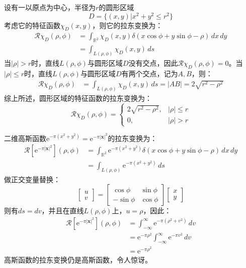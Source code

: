 \begin{example}[圆形特征函数的拉东变换]
    设有一以原点为中心，半径为$r$的圆形区域$$D=\{(x,y)|x^2+y^2\leq r^2\}$$
    考虑它的特征函数$\chi_D(x,y)$，则它的拉东变换为：
    \begin{align*}
        \mathcal{R} \chi_D(\rho,\phi)&=\int_{\mathbb{R}^2}\chi_D(x,y)\delta(x\cos\phi+y\sin\phi-\rho)\,dx\,dy\\
        &=\int_{L(\rho,\phi)}\chi_D(x,y)\,ds
    \end{align*}
    当$|\rho|>r$时，直线$L(\rho,\phi)$与圆形区域$D$没有交点，因此$\mathcal{R} \chi_D(\rho,\phi)=0$。当$|\rho|\leq r$时，直线$L(\rho,\phi)$与圆形区域$D$有两个交点，记为$A,B$，则：
    \begin{align*}
        \mathcal{R} \chi_D(\rho,\phi)&=\int_{L(\rho,\phi)}\chi_D(x,y)\,ds=|AB|=2\sqrt{r^2-\rho^2}
    \end{align*}
    综上所述，圆形区域的特征函数的拉东变换为：
    \[\mathcal{R} \chi_D(\rho,\phi)=\begin{cases}
        2\sqrt{r^2-\rho^2},&|\rho|\leq r\\
        0,&|\rho|>r
    \end{cases}\]
\end{example}
\begin{example}[高斯函数的拉东变换]
    二维高斯函数$\mathrm{e}^{-\pi(x^2+y^2)}=\mathrm{e}^{-\pi|\mathbf{x}|^2}$的拉东变换为：
    \begin{align*}
        \mathcal{R} [\mathrm{e}^{-\pi|\mathbf{x}|^2}](\rho,\phi)&=\int_{\mathbb{R}^2}\mathrm{e}^{-\pi(x^2+y^2)}\delta(x\cos\phi+y\sin\phi-\rho)\,dx\,dy\\
        &=\int_{L(\rho,\phi)}\mathrm{e}^{-\pi(x^2+y^2)}\,ds
    \end{align*}
    做正交变量替换：
    \[\begin{bmatrix}u\\v\end{bmatrix}=\begin{bmatrix}
        \cos\phi & \sin\phi\\
        -\sin\phi & \cos\phi
    \end{bmatrix}\begin{bmatrix}x\\y\end{bmatrix}\]
    则有$ds=dv$，并且在直线$L(\rho,\phi)$上，$u=\rho$，因此：
    \begin{align*}
        \mathcal{R} [\mathrm{e}^{-\pi|\mathbf{x}|^2}](\rho,\phi)&=\int_{-\infty}^{\infty}\mathrm{e}^{-\pi(\rho^2+v^2)}\,dv\\
        &=\mathrm{e}^{-\pi \rho^2}\int_{-\infty}^{\infty}\mathrm{e}^{-\pi v^2}\,dv\\
        &=\mathrm{e}^{-\pi \rho^2}
    \end{align*}
    高斯函数的拉东变换仍是高斯函数，令人惊讶。
\end{example}

